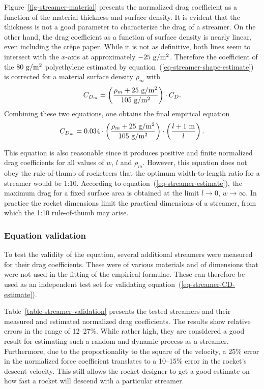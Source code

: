 Figure~\ref{fig-streamer-material} presents the normalized drag
coefficient as a function of the material thickness and surface
density.  It is evident that the thickness is not a good
parameter to characterize the drag of a streamer.  On the other hand,
the drag coefficient as a function of surface density is nearly
linear, even including the crêpe paper.  While it is not as
definitive, both lines seem to intersect with the $x$-axis at
approximately  $\rm-25~g/m^2$.  Therefore the coefficient of the
$\rm80~g/m^2$ polyethylene estimated by
equation~(\ref{eq-streamer-shape-estimate}) is corrected for a
material surface density $\rho_m$ with
%
\begin{equation}
C_{D_m} = \left(\frac{\rho_m + \rm 25~g/m^2}{\rm 105~g/m^2}\right)
    \cdot C_D.
\end{equation}
%
Combining these two equations, one obtains the final empirical
equation
%
\begin{equation}
C_{D_m} = 0.034 \cdot
    \left(\frac{\rho_m + \rm 25~g/m^2}{\rm 105~g/m^2}\right) \cdot
    \left(\frac{l + 1~{\rm m}}{l}\right).
\label{eq-streamer-CD-estimate}
\end{equation}

This equation is also reasonable since it produces positive and finite
normalized drag coefficients for all values of $w$, $l$ and $\rho_m$.
However, this equation does not obey the rule-of-thumb of rocketeers
that the optimum width-to-length ratio for a streamer would be 1:10.
According to equation~(\ref{eq-streamer-estimate}), the maximum drag
for a fixed surface area is obtained at the limit $l\rightarrow0$,
$w\rightarrow\infty$.  In practice the rocket dimensions limit the
practical dimensions of a streamer, from which the 1:10 rule-of-thumb
may arise.


\subsubsection*{Equation validation}

To test the validity of the equation, several additional streamers
were measured for their drag coefficients.  These were of various
materials and of dimensions that were not used in the fitting of the
empirical formulae.  These can therefore be used as an independent
test set for validating equation~(\ref{eq-streamer-CD-estimate}).

Table~\ref{table-streamer-validation} presents the tested streamers
and their measured and estimated normalized drag coefficients.  The
results show relative errors in the range of 12--27\%.  While rather
high, they are considered a good result for estimating such a random
and dynamic process as a streamer.  Furthermore, due to the
proportionality to the square of the velocity, a 25\% error in the
normalized force coefficient translates to a 10--15\% error in the
rocket's descent velocity.  This still allows the rocket designer to
get a good estimate on how fast a rocket will descend with a
particular streamer.



